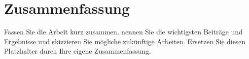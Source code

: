 \section{Zusammenfassung}

Fassen Sie die Arbeit kurz zusammen, nennen Sie die wichtigsten Beiträge und
Ergebnisse und skizzieren Sie mögliche zukünftige Arbeiten. Ersetzen Sie diesen
Platzhalter durch Ihre eigene Zusammenfassung.
